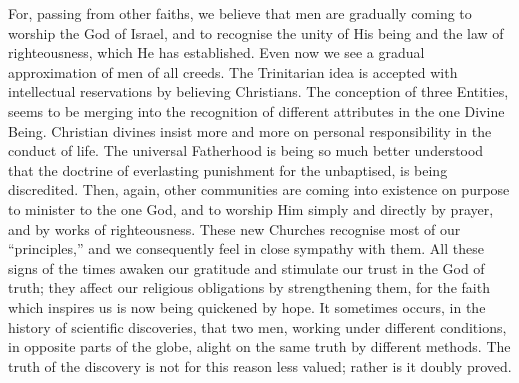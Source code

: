 For, passing from other faiths, we believe
that men are gradually coming to worship the
God of Israel, and to recognise the unity of
His being and the law of righteousness,
which He has established. Even now we
see a gradual approximation of men of all
creeds. The Trinitarian idea is accepted
with intellectual reservations by believing
Christians. The conception of three Entities,
seems to be merging into the recognition of
different attributes in the one Divine Being.
Christian divines insist more and more on
personal responsibility in the conduct of life.
The universal Fatherhood is being so much
better understood that the doctrine of everlasting
punishment for the unbaptised, is
being discredited. Then, again, other communities
are coming into existence on
purpose to minister to the one God, and to
worship Him simply and directly by prayer,
and by works of righteousness. These new
Churches recognise most of our “principles,”
and we consequently feel in close sympathy
with them. All these signs of the times
awaken our gratitude and stimulate our
trust in the God of truth; they affect
our religious obligations by strengthening
them, for the faith which inspires us is
now being quickened by hope. It sometimes
occurs, in the history of scientific discoveries,
that two men, working under different
conditions, in opposite parts of the globe,
alight on the same truth by different methods.
The truth of the discovery is not for this
reason less valued; rather is it doubly proved.

